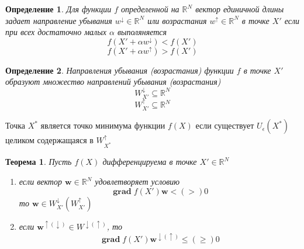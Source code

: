 \documentclass[14pt]{extarticle}
\newtheorem{theorem}{Теорема}
\newtheorem{definiiton}{Определение}
\DeclareMathOperator{\grad}{\textbf{grad}}
\begin{document}
\begin{definiiton}
	Для функции $f$ определенной на  $\mathbb{R}^{N}$
	вектор единичной длины задает направление убывания
	$w^{\downarrow} \in \mathbb{R}^{N}$ или
	возрастания $w^{\uparrow} \in \mathbb{R}^{N}$ 
	в точке $X'$ если при всех достаточно малых
	$\alpha$ выполяняется
	\begin{equation}
	f(X' + \alpha w^{\downarrow}) < f(X')
	\end{equation}
	\begin{equation}
	f(X' + \alpha w^{\uparrow}) > f(X')
	\end{equation}
\end{definiiton}
\begin{definiiton}
	Направления убывания (возрастания) 
	функции $f$ в точке  $X'$ 
	образуют множество направлений убывания (возрастания)
	 \begin{equation}
		W_{X'}^{\downarrow} \subseteq \mathbb{R}^{N}
	\end{equation}
	 \begin{equation}
		W_{X'}^{\uparrow} \subseteq \mathbb{R}^{N}
	\end{equation}
\end{definiiton}
Точка $X^{*}$ является точко минимума функции $f(X)$ 
если существует  $U_{\epsilon}(X^{*})$ целиком содержащаяся 
в $W^{\uparrow}_{X^{*}}$
\begin{theorem}
	Пусть $f(X)$ дифференцируема в точке  $X' \in \mathbb{R}^{N}$
	 \begin{enumerate}
	 	\item если вектор $\mathbf{w} \in \mathbb{R}^{N}$
			удовлетворяет условию
			\begin{equation}
				\grad f(X') \mathbf{w} < (>) 0
			\end{equation}
			то $\mathbf{w} \in W_{X'}^{\downarrow} (W_{X'}^{\uparrow})$
		 \item если $\mathbf{w}^{\uparrow (\downarrow)} 
			 \in W^{\downarrow (\uparrow)}$, то
			 \begin{equation}
			 	\grad f(X') \mathbf{w}^{\downarrow (\uparrow)} \le  (\ge ) 0
			 \end{equation}
	 \end{enumerate}
\end{theorem}
\end{document}

